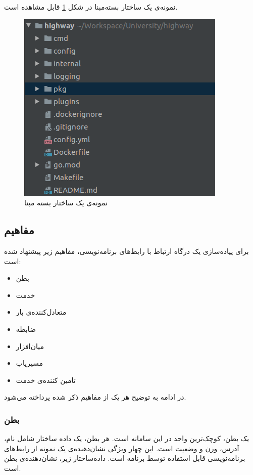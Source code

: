 نمونه‌ی یک ساختار بسته‌مبنا در شکل
\ref{package_oriented_pic}
قابل مشاهده است.

\begin{figure}[H]
    \centering
    \label{package_oriented_pic}
    \includegraphics[scale=0.4]{images/PackageOriented.png}
    \caption{نمونه‌ی یک ساختار بسته مبنا}
\end{figure}

\cleardoublepage

\subsection{مفاهیم}\label{subsec:impl_concepts}
برای پیاده‌سازی یک درگاه ارتباط با رابط‌های برنامه‌نویسی، مفاهیم زیر پیشنهاد شده است:

\begin{itemize}
    \item بطن 
    \item خدمت 
    \item متعادل‌کننده‌ی بار 
    \item ضابطه 
    \item میان‌افزار 
    \item مسیریاب 
    \item تامین کننده‌ی خدمت 
\end{itemize}

در ادامه به توضیح هر یک از مفاهیم ذکر‌ شده پرداخته‌ می‌شود.

\subsubsection{بطن}
یک بطن، کوچک‌ترین واحد در این سامانه است. هر بطن، یک داده ساختار شامل نام، آدرس، وزن و وضعیت است. این چهار ویژگی نشان‌دهنده‌ی یک نمونه از رابط‌های برنامه‌نویسی قابل استفاده توسط برنامه است. داده‌ساختار زیر، نشان‌دهنده‌ی بطن است.

